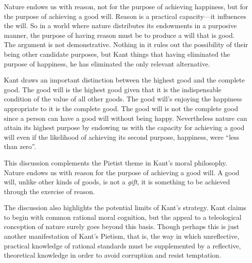 Nature endows us with reason, not for the purpose of achieving happiness, but for the purpose of achieving a good will. Reason is a practical capacity—it influences the will. So in a world where nature distributes its endowments in a purposive manner, the purpose of having reason must be to produce a will that is good. The argument is not demonstrative. Nothing in it rules out the possibility of their being other candidate purposes, but Kant things that having eliminated the purpose of happiness, he has eliminated the only relevant alternative.

Kant draws an important distinction between the highest good and the complete good. The good will is the highest good given that it is the indispensable condition of the value of all other goods. The good will’s enjoying the happiness appropriate to it is the complete good. The good will is not the complete good since a person can have a good will without being happy. Nevertheless nature can attain its highest purpose by endowing us with the capacity for achieving a good will even if the likelihood of achieving its second purpose, happiness, were ``less than zero''.

This discussion complements the Pietist theme in Kant’s moral philosophy. Nature endows us with reason for the purpose of achieving a good will. A good will, unlike other kinds of goods, is not a \emph{gift}, it is something to be achieved through the exercise of reason.

The discussion also highlights the potential limits of Kant’s strategy. Kant claims to begin with common rational moral cognition, but the appeal to a teleological conception of nature surely goes beyond this basis. Though perhaps this is just another manifestation of Kant’s Pietism, that is, the way in which unreflective, practical knowledge of rational standards must be supplemented by a reflective, theoretical knowledge in order to avoid corruption and resist temptation.

% 


